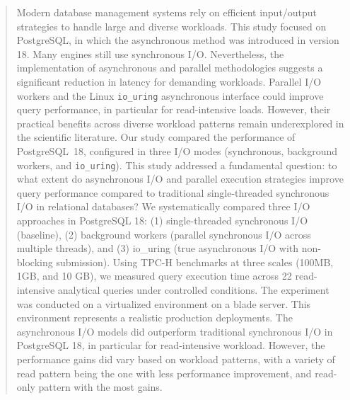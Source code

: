 \documentclass[conference]{IEEEtran}
\begin{document}
\begin{abstract}
Modern database management systems rely on efficient input/output strategies to handle large and diverse workloads. This study focused on PostgreSQL, in which the asynchronous method was introduced in version 18. Many engines still use synchronous I/O. Nevertheless, the implementation of asynchronous and parallel methodologies suggests a significant reduction in latency for demanding workloads. Parallel I/O workers and the Linux \texttt{io\_uring} asynchronous interface could improve query performance, in particular for read-intensive loads. However, their practical benefits across diverse workload patterns remain underexplored in the scientific literature. Our study compared the performance of PostgreSQL~18, configured in three I/O modes (synchronous, background workers, and \texttt{io\_uring}).
This study addressed a fundamental question: to what extent do asynchronous I/O and parallel execution strategies improve query performance compared to traditional single-threaded synchronous I/O in relational databases? We systematically compared three I/O approaches in PostgreSQL 18: (1) single-threaded synchronous I/O (baseline), (2) background workers (parallel synchronous I/O across multiple threads), and (3) io\_uring (true asynchronous I/O with non-blocking submission). Using TPC-H benchmarks at three scales (100MB, 1GB, and 10 GB), we measured query execution time across 22 read-intensive analytical queries under controlled conditions. The experiment was conducted on a virtualized environment on a blade server. This environment represents a realistic production deployments.
The asynchronous I/O models did outperform traditional synchronous I/O in PostgreSQL 18, in particular for read-intensive workload. However, the performance gains did vary based on workload patterns, with a variety of read pattern being the one with less performance improvement, and read-only pattern with the most gains.
\end{abstract}
\end{document}
